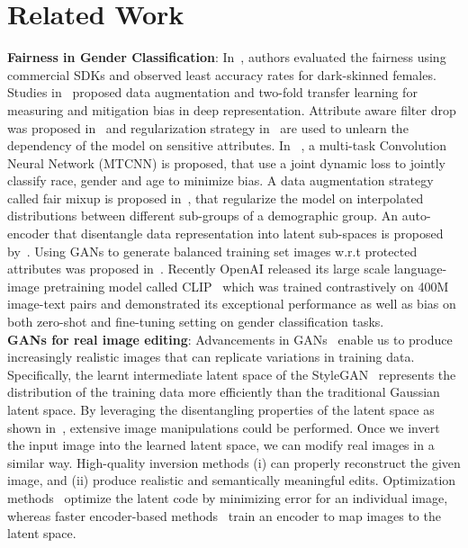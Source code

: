 \documentclass[runningheads]{llncs}
\begin{document}
\section{Related Work}

\noindent\textbf{Fairness in Gender Classification}:
In~\cite{gender_shades}, authors evaluated the fairness using commercial SDKs and observed least accuracy rates for dark-skinned females. Studies in~\cite{gender_age_transfer,Ryu18} proposed data augmentation and two-fold transfer learning for measuring and mitigation bias in deep representation. Attribute aware filter drop was proposed in~\cite{att_aware_filter} and regularization strategy in~\cite{tartaglione} are used to unlearn the dependency of the model on sensitive attributes. 
In ~\cite{multitask}, a multi-task Convolution Neural Network (MTCNN) is proposed, that use a joint dynamic loss to jointly classify race, gender and age to minimize bias. A data augmentation strategy called fair mixup is proposed in~\cite{fair_mixup}, that regularize the model on interpolated distributions between different sub-groups of a demographic group. An auto-encoder that disentangle data representation into latent sub-spaces is proposed by~\cite{readme}. 
Using GANs to generate balanced training set images w.r.t protected attributes was proposed in~\cite{gan_debias}. Recently OpenAI released its large scale language-image pretraining model called CLIP~\cite{clip} which was trained contrastively on 400M image-text pairs and demonstrated its exceptional performance as well as bias on both zero-shot and fine-tuning setting on gender classification tasks.\\


\noindent \textbf{GANs for real image editing}: 
Advancements in GANs~\cite{gan,gan1,progan,bigan,stylegan,stylegan2,stylegan2-ada} enable us to produce increasingly realistic images that can replicate variations in training data. Specifically, the learnt intermediate latent space of the StyleGAN~\cite{stylegan,stylegan2,stylegan2-ada} represents the distribution of the training data more efficiently than the traditional Gaussian latent space. By leveraging the disentangling properties of the latent space as shown in~\cite{editing4,walking1,editing2,editing1,e4e,psp}, extensive image manipulations could be performed. Once we invert the input image into the learned latent space, we can modify real images in a similar way. High-quality inversion methods (i) can properly reconstruct the given image, and (ii) produce realistic and semantically meaningful edits. Optimization methods~\cite{invert3,invert2,invert1} optimize the latent code by minimizing error for an individual image, whereas faster encoder-based methods~\cite{invert4,invert5,e4e} train an encoder to map images to the latent space. 
\end{document}
